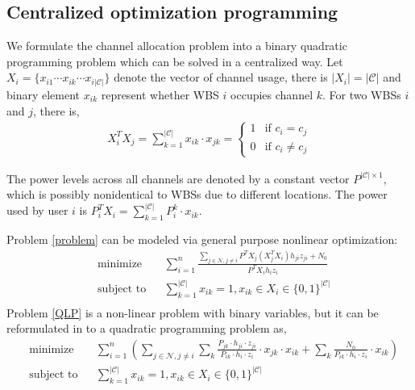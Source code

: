 \subsection{Centralized optimization programming}
\label{03_centralized_ca}
We formulate the channel allocation problem into a binary quadratic programming problem which can be solved in a centralized way.  
Let $X_i = \{x_{i1}\cdots x_{ik}\cdots x_{i|\mathcal{C}|}\}$ denote the vector of channel usage, there is $|X_i| = |\mathcal{C}|$ and binary element $x_{ik}$ represent whether WBS $i$ occupies channel $k$.
For two WBSs $i$ and $j$, there is,
\begin{equation}
\begin{split}
X_i^TX_j = \sum\limits_{k=1}^{|\mathcal{C}|}x_{ik}\cdot x_{jk} = 
\left\{ \begin{array}{ll}
1 & \mbox{if $c_i=c_j$} \\
0 & \mbox{if $c_i\neq c_j$} 
\end{array}
\right.
\end{split}
\end{equation}

The power levels across all channels are denoted by a constant vector $P^{|\mathcal{C}|\times 1}$, which is possibly nonidentical to WBSs due to different locations. 
The power used by user $i$ is $P_i^TX_i = \sum\limits_{k=1}^{|\mathcal{C}|}P_{i}^k\cdot x_{ik}$.


Problem \ref{problem} can be modeled via general purpose nonlinear optimization:
	\begin{equation}
\label{QLP}
		\begin{aligned}
		& \underset{}{\text{minimize}}
		& & \sum\limits^{n}_{i=1} \frac{\sum\limits_{j\in\mathcal{N}, j\neq i}P^TX_j(X_j^TX_i)h_{ji}z_{ji} + N_0}{P^TX_ih_iz_i}\\
		& \text{subject to}
		& & \sum\limits_{k=1}^{|\mathcal{C}|}x_{ik}=1, x_{ik}\in X_i\in \{0,1\}^{|\mathcal{C}|}\\
		\end{aligned}
	\end{equation}
Problem \ref{QLP} is a non-linear problem with binary variables, but it can be reformulated in to a quadratic programming problem as,
	\begin{equation}
\label{QLP_2}
			\begin{aligned}
			& \underset{}{\text{minimize}}
			& &	\sum\limits^{n}_{i=1} ( \sum\limits_{j\in\mathcal{N}, j\neq i}\sum\limits_k \frac{P_{jk}\cdot h_{ji}\cdot z_{ji}}{P_{ik}\cdot h_i\cdot z_i}\cdot  x_{jk}\cdot x_{ik}  + \sum\limits_k \frac{N_0}{P_{ik}\cdot h_i\cdot z_i}\cdot x_{ik})\\
			& \text{subject to} 
			& & \sum\limits_{k=1}^{|\mathcal{C}|}x_{ik}=1, x_{ik}\in X_i\in \{0,1\}^{|\mathcal{C}|}\\
			\end{aligned}
		\end{equation}

